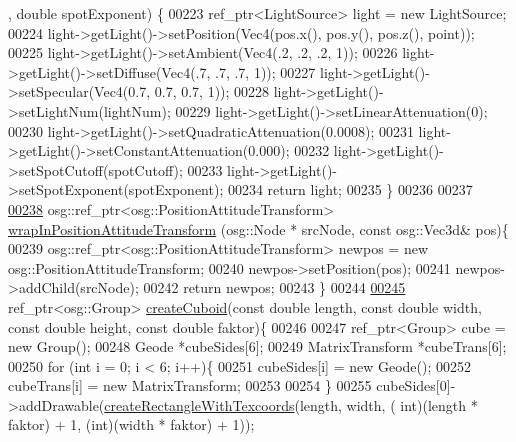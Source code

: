 \begin{DoxyCode}
      , \textcolor{keywordtype}{double} spotExponent) \{
00223         ref\_ptr<LightSource> light = \textcolor{keyword}{new} LightSource;
00224         light->getLight()->setPosition(Vec4(pos.x(), pos.y(), pos.z(), point));
00225         light->getLight()->setAmbient(Vec4(.2, .2, .2, 1));
00226         light->getLight()->setDiffuse(Vec4(.7, .7, .7, 1));
00227         light->getLight()->setSpecular(Vec4(0.7, 0.7, 0.7, 1));
00228         light->getLight()->setLightNum(lightNum);
00229         light->getLight()->setLinearAttenuation(0);
00230         light->getLight()->setQuadraticAttenuation(0.0008);
00231         light->getLight()->setConstantAttenuation(0.000);
00232         light->getLight()->setSpotCutoff(spotCutoff);
00233         light->getLight()->setSpotExponent(spotExponent);
00234         \textcolor{keywordflow}{return} light;
00235     \}
00236 
00237 
\hypertarget{_util_functions_8cpp_source_l00238}{}\hyperlink{namespacebrtr_a887d7975f37c4334b70e2196735b6678}{00238}   osg::ref\_ptr<osg::PositionAttitudeTransform> \hyperlink{namespacebrtr_a887d7975f37c4334b70e2196735b6678}{wrapInPositionAttitudeTransform}
      (osg::Node * srcNode, \textcolor{keyword}{const} osg::Vec3d& pos)\{
00239     osg::ref\_ptr<osg::PositionAttitudeTransform> newpos = \textcolor{keyword}{new} osg::PositionAttitudeTransform;
00240     newpos->setPosition(pos);
00241     newpos->addChild(srcNode);
00242     \textcolor{keywordflow}{return} newpos;    
00243   \}
00244 
\hypertarget{_util_functions_8cpp_source_l00245}{}\hyperlink{namespacebrtr_ae7f155c263aec9663a02763ed0bb882b}{00245}     ref\_ptr<osg::Group> \hyperlink{namespacebrtr_ae7f155c263aec9663a02763ed0bb882b}{createCuboid}(\textcolor{keyword}{const} \textcolor{keywordtype}{double} length, \textcolor{keyword}{const} \textcolor{keywordtype}{double} width, \textcolor{keyword}{const} \textcolor{keywordtype}{double} 
      height, \textcolor{keyword}{const} \textcolor{keywordtype}{double} faktor)\{
00246 
00247         ref\_ptr<Group> cube = \textcolor{keyword}{new} Group();
00248         Geode *cubeSides[6];
00249         MatrixTransform *cubeTrans[6];
00250         \textcolor{keywordflow}{for} (\textcolor{keywordtype}{int} i = 0; i < 6; i++)\{
00251             cubeSides[i] = \textcolor{keyword}{new} Geode();
00252             cubeTrans[i] = \textcolor{keyword}{new} MatrixTransform;
00253             
00254         \}
00255         cubeSides[0]->addDrawable(\hyperlink{namespacebrtr_a4e91424e74398a612c38a920df0577ef}{createRectangleWithTexcoords}(length, width, (\textcolor{keywordtype}{
      int})(length * faktor) + 1, (\textcolor{keywordtype}{int})(width * faktor) + 1));

\end{DoxyCode}

